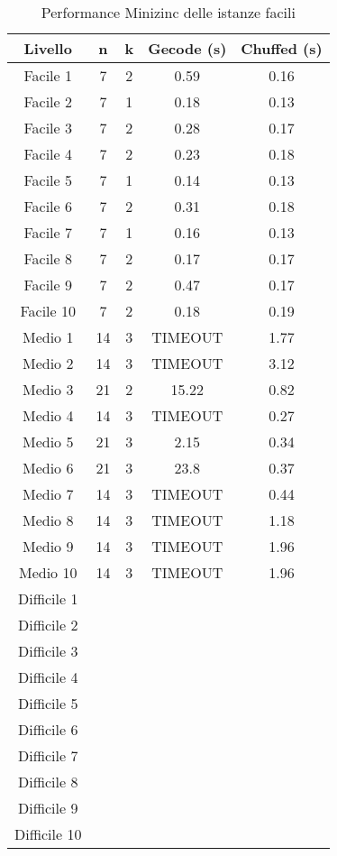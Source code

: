 \documentclass{article}
\begin{document}
\begin{multicols*}{2}
\begin{table}[H]
    \centering
    \caption{Performance Minizinc delle istanze facili}
    \label{tab:minizinc}
    \begin{tabular}{|c|c|c|c|c|}
        \hline
        \textbf{Livello} & \textbf{n} & \textbf{k} & \textbf{Gecode (s)} & \textbf{Chuffed (s)} \\
        \hline
        Facile 1 & 7 & 2 & 0.59 & 0.16 \\
        Facile 2 & 7 & 1 & 0.18 & 0.13 \\
        Facile 3 & 7 & 2 & 0.28 & 0.17 \\
        Facile 4 & 7 & 2 & 0.23 & 0.18 \\
        Facile 5 & 7 & 1 & 0.14 & 0.13 \\
        Facile 6 & 7 & 2 & 0.31 & 0.18 \\
        Facile 7 & 7 & 1 & 0.16 & 0.13 \\
        Facile 8 & 7 & 2 & 0.17 & 0.17 \\
        Facile 9 & 7 & 2 & 0.47 & 0.17 \\
        Facile 10 & 7 & 2 & 0.18 & 0.19 \\
        Medio 1 & 14 & 3 & TIMEOUT & 1.77 \\
        Medio 2 & 14 & 3 & TIMEOUT & 3.12 \\
        Medio 3 & 21 & 2 & 15.22 & 0.82 \\
        Medio 4 & 14 & 3 & TIMEOUT & 0.27\\
        Medio 5 & 21 & 3 & 2.15 & 0.34 \\
        Medio 6 & 21 & 3 & 23.8 & 0.37 \\
        Medio 7 & 14 & 3 & TIMEOUT & 0.44 \\
        Medio 8 & 14 & 3 & TIMEOUT & 1.18 \\
        Medio 9 & 14 & 3 & TIMEOUT & 1.96 \\
        Medio 10 & 14 & 3 & TIMEOUT & 1.96 \\
        Difficile 1 \\
        Difficile 2 \\
        Difficile 3 \\
        Difficile 4 \\
        Difficile 5 \\
        Difficile 6 \\
        Difficile 7 \\
        Difficile 8 \\
        Difficile 9 \\
        Difficile 10 \\
        \hline
    \end{tabular}
\end{table}




\end{multicols*}
\end{document}
